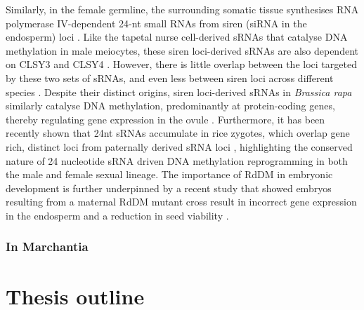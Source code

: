 Similarly, in the female germline, the surrounding somatic tissue synthesises RNA polymerase IV-dependent 24-nt small RNAs from siren (siRNA in the endosperm) loci \citep{RN164,RN163,RN162}. Like the tapetal nurse cell-derived sRNAs that catalyse DNA methylation in male meiocytes, these siren loci-derived sRNAs are also dependent on CLSY3 and CLSY4 \citep{RN162}. However, there is little overlap between the loci targeted by these two sets of sRNAs, and even less between siren loci across different species \citep{RN163}. Despite their distinct origins, siren loci-derived sRNAs in \textit{Brassica rapa} similarly catalyse DNA methylation, predominantly at protein-coding genes, thereby regulating gene expression in the ovule \citep{RN165}. Furthermore, it has been recently shown that 24nt sRNAs accumulate in rice zygotes, which overlap gene rich, distinct loci from paternally derived sRNA loci \citep{RN166}, highlighting the conserved nature of 24 nucleotide sRNA driven DNA methylation reprogramming in both the male and female sexual lineage. The importance of RdDM in embryonic development is further underpinned by a recent study that showed embryos resulting from a maternal RdDM mutant cross result in incorrect gene expression in the endosperm and a reduction in seed viability \citep{RN167}.



\subsubsection{In Marchantia}

\section{Thesis outline}



